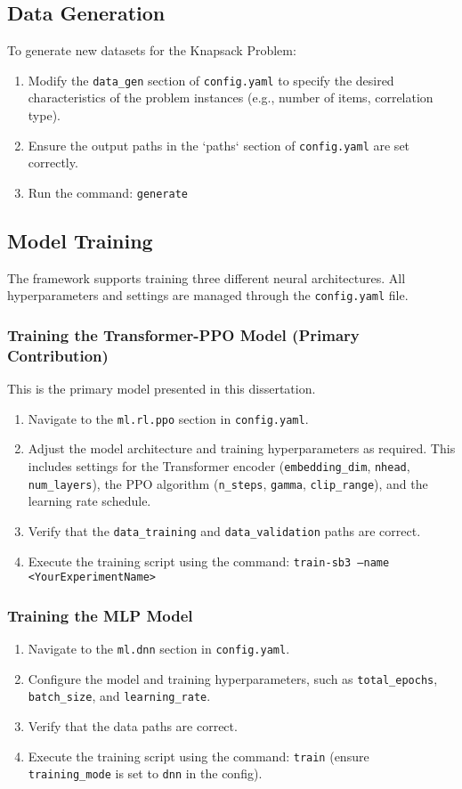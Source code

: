 \subsection{Data Generation}
To generate new datasets for the Knapsack Problem:
\begin{enumerate}
    \item Modify the \texttt{data\_gen} section of \texttt{config.yaml} to specify the desired characteristics of the problem instances (e.g., number of items, correlation type).
    \item Ensure the output paths in the `paths` section of \texttt{config.yaml} are set correctly.
    \item Run the command: \texttt{generate}
\end{enumerate}

\subsection{Model Training}
The framework supports training three different neural architectures. All hyperparameters and settings are managed through the \texttt{config.yaml} file.

\subsubsection{Training the Transformer-PPO Model (Primary Contribution)}
This is the primary model presented in this dissertation.
\begin{enumerate}
    \item Navigate to the \texttt{ml.rl.ppo} section in \texttt{config.yaml}.
    \item Adjust the model architecture and training hyperparameters as required. This includes settings for the Transformer encoder (\texttt{embedding\_dim}, \texttt{nhead}, \texttt{num\_layers}), the PPO algorithm (\texttt{n\_steps}, \texttt{gamma}, \texttt{clip\_range}), and the learning rate schedule.
    \item Verify that the \texttt{data\_training} and \texttt{data\_validation} paths are correct.
    \item Execute the training script using the command: \texttt{train-sb3 --name <YourExperimentName>}
\end{enumerate}

\subsubsection{Training the MLP Model}
\begin{enumerate}
    \item Navigate to the \texttt{ml.dnn} section in \texttt{config.yaml}.
    \item Configure the model and training hyperparameters, such as \texttt{total\_epochs}, \texttt{batch\_size}, and \texttt{learning\_rate}.
    \item Verify that the data paths are correct.
    \item Execute the training script using the command: \texttt{train} (ensure \texttt{training\_mode} is set to \texttt{dnn} in the config).
\end{enumerate}

